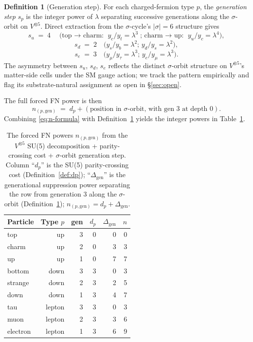 \documentclass[11pt,reqno]{amsart}
\theoremstyle{plain}
\theoremstyle{definition}
\newtheorem{definition}[theorem]{Definition}
\theoremstyle{remark}
\begin{document}
\begin{definition}[Generation step]\label{def:step}
For each charged-fermion type $p$, the \emph{generation step}
$s_{p}$ is the integer power of $\lambda$ separating successive
generations along the $\sigma$-orbit on $V^{\otimes 5}$. Direct
extraction from the $\sigma$-cycle's $|\sigma| = 6$ structure
gives
\[
  s_{u} \;=\; 4 \quad\text{(top $\to$ charm: } y_{c}/y_{t} = \lambda^{3}\text{; charm $\to$ up: } y_{u}/y_{c} = \lambda^{4}\text{)},
\]
\[
  s_{d} \;=\; 2 \quad\text{(}y_{s}/y_{b} = \lambda^{2}\text{; }y_{d}/y_{s} = \lambda^{2}\text{)},
\]
\[
  s_{e} \;=\; 3 \quad\text{(}y_{\mu}/y_{\tau} = \lambda^{3}\text{; }y_{e}/y_{\mu} = \lambda^{3}\text{)}.
\]
The asymmetry between $s_{u}$, $s_{d}$, $s_{e}$ reflects the
distinct $\sigma$-orbit structure on $V^{\otimes 5}$'s
matter-side cells under the SM gauge action; we track the
pattern empirically and flag its substrate-natural assignment
as open in \S\ref{sec:open}.
\end{definition}

The full forced FN power is then
\begin{equation}
  n_{(p, \mathrm{gen})} \;=\; d_{p} + (\text{position in $\sigma$-orbit, with gen 3 at depth 0}).\label{eq:n-formula}
\end{equation}
Combining \eqref{eq:n-formula} with Definition~\ref{def:step}
yields the integer powers in Table~\ref{tab:powers}.

\begin{table}[h]
\centering
\caption{The forced FN powers $n_{(p,\mathrm{gen})}$ from the
$V^{\otimes 5}$ SU(5) decomposition + parity-crossing cost +
$\sigma$-orbit generation step. Column ``$d_{p}$'' is the SU(5)
parity-crossing cost (Definition~\ref{def:dp}); ``$\Delta_{\mathrm{gen}}$'' is the
generational suppression power separating the row from
generation $3$ along the $\sigma$-orbit
(Definition~\ref{def:step}); $n_{(p,\mathrm{gen})} = d_{p} +
\Delta_{\mathrm{gen}}$.}
\label{tab:powers}
\begin{tabular}{lrrrrr}
\toprule
Particle & Type $p$ & gen & $d_{p}$ & $\Delta_{\mathrm{gen}}$ & $n$ \\
\midrule
top      & up     & 3 & 0 & 0 & 0 \\
charm    & up     & 2 & 0 & 3 & 3 \\
up       & up     & 1 & 0 & 7 & 7 \\
bottom   & down   & 3 & 3 & 0 & 3 \\
strange  & down   & 2 & 3 & 2 & 5 \\
down     & down   & 1 & 3 & 4 & 7 \\
tau      & lepton & 3 & 3 & 0 & 3 \\
muon     & lepton & 2 & 3 & 3 & 6 \\
electron & lepton & 1 & 3 & 6 & 9 \\
\bottomrule
\end{tabular}
\end{table}
\end{document}
